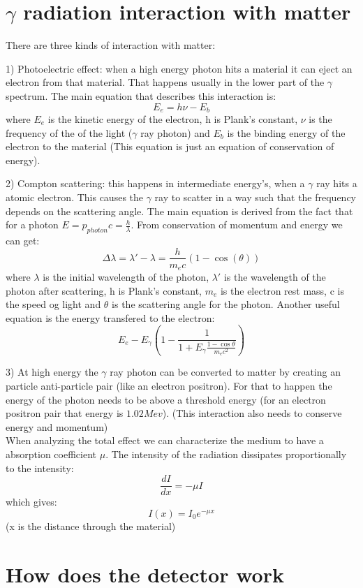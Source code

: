 \documentclass[]{article}
\begin{document}
\section{$\gamma$ radiation interaction with matter}

There are three kinds of interaction with matter:

1) Photoelectric effect: when a high energy photon hits a material it can eject an electron from that material. That happens usually in the lower part of the $\gamma$ spectrum. The main equation that describes this interaction is: $$E_e=h\nu-E_b$$ where $E_e$ is the kinetic energy of the electron, h is Plank's constant, $\nu$ is the frequency of the of the light ($\gamma$ ray photon) and $E_b$ is the binding energy of the electron to the material (This equation is just an equation of conservation of energy).

2) Compton scattering: this happens in intermediate energy's, when a $\gamma$ ray hits a atomic electron. This causes the $\gamma$ ray to scatter in a way such that the frequency depends on the scattering angle. The main equation is derived from the fact that for a photon $E=p_{photon}c=\frac{h}{\lambda}$. From conservation of momentum and energy we can get: $$\Delta \lambda =\lambda '-\lambda=\frac{h}{m_ec}(1-\cos(\theta))$$ where $\lambda$ is the initial wavelength of the photon, $\lambda'$ is the wavelength of the photon after scattering, h is Plank's constant, $m_e$ is the electron rest mass, c is the speed og light and $\theta$ is the scattering angle for the photon. Another useful equation is the energy transfered to the electron: $$E_e-E_\gamma \left(1-\frac{1}{1+E_\gamma \frac{1-\cos\theta}{m_ec^2}}\right)$$  

3) At high energy the $\gamma$ ray photon can be converted to matter by creating an particle anti-particle pair (like an electron positron). For that to happen the energy of the photon needs to be above a threshold energy (for an electron positron pair that energy is $1.02Mev$). (This interaction also needs to conserve energy and momentum)\\ 
When analyzing the total effect we can characterize the medium to have a absorption coefficient $\mu$. The intensity of the radiation dissipates proportionally to the intensity: $$\frac{dI}{dx}=-\mu I$$ which gives: $$I(x)=I_0e^{-\mu x}$$ (x is the distance through the material)

\section{How does the detector work}
\end{document}
